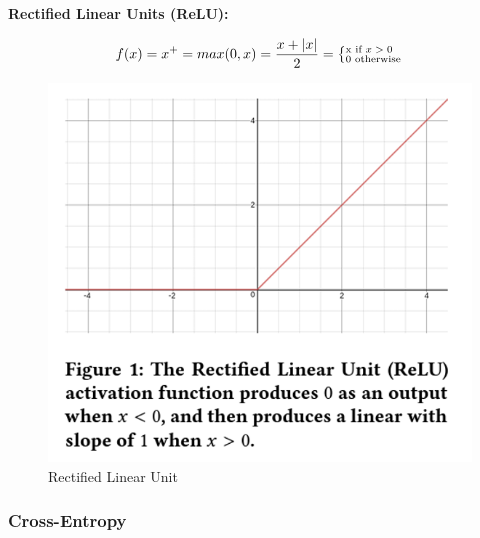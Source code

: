 \documentclass[12pt]{article}
\begin{document}
                \textbf{Rectified Linear Units (ReLU):}
            
                \begin{large}
                    
                    \[ f(x) = x^+ = max(0, x) = \frac{x + \vert x \vert}{2} = 
                    \left \{^{\textnormal{x if $x > 0$}}_{\textnormal{0 otherwise}} \right. \]

                \end{large}

                \begin{figure}[ht]
            
                    \begin{center}
    
                        \includegraphics[scale=0.8]{relu.png}
                        \caption{Rectified Linear Unit \cite{agarap2019}}
                        \label{relu-fig}
            
                    \end{center}
                    
                \end{figure}            

                
            \subsubsection{Cross-Entropy}
                
\end{document}
